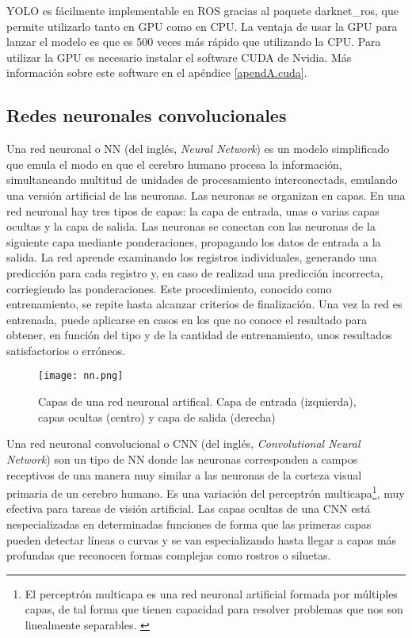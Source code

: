 YOLO es fácilmente implementable en ROS gracias al paquete darknet\_ros, que permite utilizarlo tanto en GPU como en CPU. La ventaja de usar la GPU para lanzar el modelo es que es 500 veces más rápido que utilizando la CPU. Para utilizar la GPU es necesario instalar el software CUDA de Nvidia. Más información sobre este software en el apéndice \ref{apendA.cuda}.\\

\subsection{Redes neuronales convolucionales}

Una red neuronal o NN (del inglés, \textit{Neural Network}) es un modelo simplificado que emula el modo en que el cerebro humano procesa la información, simultaneando multitud de unidades de procesamiento interconectads, emulando una versión artificial de las neuronas. Las neuronas se organizan en capas. En una red neuronal hay tres tipos de capas: la capa de entrada, unas o varias capas ocultas y la capa de salida. Las neuronas se conectan con las neuronas de la siguiente capa mediante ponderaciones, propagando los datos de entrada a la salida. La red aprende examinando los registros individuales, generando una predicción para cada registro y, en caso de realizad una predicción incorrecta, corriegiendo las ponderaciones. Este procedimiento, conocido como entrenamiento, se repite hasta alcanzar criterios de finalización.  Una vez la red es entrenada, puede aplicarse en casos en los que no conoce el resultado para obtener, en función del tipo y de la cantidad de entrenamiento, unos resultados satisfactorios o erróneos. \cite{nn}\\

\begin{figure}[h]
	\begin{center} 
		\texttt{[image: nn.png]}
	\end{center}
	\caption{Capas de una red neuronal artifical. Capa de entrada (izquierda), capas ocultas (centro) y capa de salida (derecha) \cite{foto_nn}}
	\label{fig:nn}
\end{figure}

Una red neuronal convolucional o CNN (del inglés, \textit{Convolutional Neural Network}) son un tipo de NN donde las neuronas corresponden a campos receptivos de una manera muy similar a las neuronas de la corteza visual primaria de un cerebro humano. Es una variación del perceptrón multicapa\footnote{El perceptrón multicapa es una red neuronal artificial formada por múltiples capas, de tal forma que tienen capacidad para resolver problemas que nos son linealmente separables. \cite{perceptron}}, muy efectiva para tareas de visión artificial. Las capas ocultas de una CNN está nespecializadas en determinadas funciones de forma que las primeras capas pueden detectar líneas o curvas y se van especializando hasta llegar a capas más profundas que reconocen formas complejas como rostros o siluetas. \cite{cnn} \\

